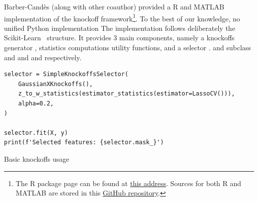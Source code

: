 Barber-Candès (along with other coauthor) provided a R and MATLAB implementation
of the knockoff framework\footnote{
    The R package page can be found at
    \href{https://cran.r-project.org/web/packages/knockoff/index.html}{this address}.
    Sources for both R and MATLAB are stored in this
    \href{https://github.com/msesia/knockoff-filter}{GitHub repository}.
}.
To the best of our knowledge, no unified Python implementation
The implementation follows deliberately the Scikit-Learn~\cite{sklearn} structure.
It provides 3 main components,
namely a knockoffs generator ,
statistics computations utility functions,
and a selector .
 and  subclass  and 
and  and  respectively.

\begin{calgorithm}
\begin{verbatim}
selector = SimpleKnockoffsSelector(
    GaussianXKnockoffs(),
    z_to_w_statistics(estimator_statistics(estimator=LassoCV())),
    alpha=0.2,
)

selector.fit(X, y)
print(f'Selected features: {selector.mask_}')
\end{verbatim}
\caption{
    Basic knockoffs usage
}\label{code:python_knockoffs}
\end{calgorithm}
